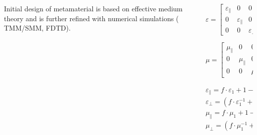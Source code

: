 \documentclass{beamer}
\begin{document}
\begin{frame}
\begin{columns}
\begin{column}{0.5\textwidth}
\begin{figure}
			\end{figure}
		 	{\tiny Initial design of metamaterial is based on effective medium theory and is further refined with numerical simulations ( TMM/SMM, FDTD).}
		\end{column}
		 \begin{column}{0.5\textwidth}
			\[ \varepsilon= \left[ \begin{array}{ccc}
							\varepsilon_{\parallel} & 0 & 0 \\
							0 & \varepsilon_{\parallel} & 0 \\
							0 & 0 &  \varepsilon_{\perp} \end{array} \right]
			\] 		

			\[ \mu= \left[ \begin{array}{ccc}
							\mu_{\parallel} & 0 & 0 \\
							0 & \mu_{\parallel} & 0 \\
							0 & 0 &  \mu_{\perp} \end{array} \right]
			\] 		

			$\varepsilon_{\parallel}=f\cdot{\varepsilon_1}+{1-f}\cdot \varepsilon_2$\\
			$\varepsilon_{\perp}=\left(f\cdot{\varepsilon_1^{-1}}+(1-f)\cdot \varepsilon_2^{-1}\right)^{-1}$\\
			$\mu_{\parallel}=f\cdot{\mu_1}+{1-f}\cdot \mu_2$\\
			$\mu_{\perp}=\left(f\cdot{\mu_1^{-1}}+(1-f)\cdot \mu_2^{-1}\right)^{-1}$
		\end{column}
	\end{columns}
	{\tiny {\tiny  \cite{PhysRevLett.85.3966}}}
\end{frame}
\end{document}
